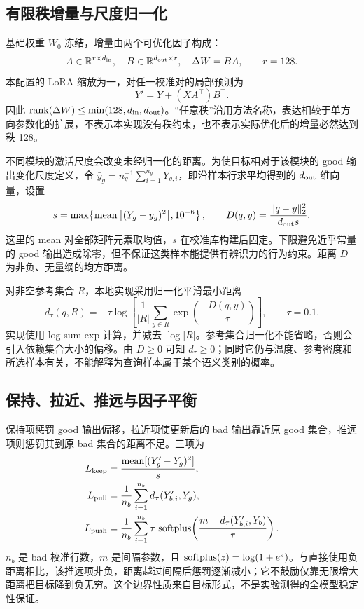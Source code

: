 \subsection{有限秩增量与尺度归一化}

基础权重 $W_0$ 冻结，增量由两个可优化因子构成：
\begin{equation}
 A\in\mathbb{R}^{r\times d_{\rm in}},\quad
 B\in\mathbb{R}^{d_{\rm out}\times r},\quad
 \Delta W=BA,\qquad r=128.
 \label{eq:factors}
\end{equation}
本配置的 LoRA 缩放为一，对任一校准对的局部预测为
\begin{equation}
 Y'=Y+(XA^\top)B^\top.
 \label{eq:local-output}
\end{equation}
因此 $\operatorname{rank}(\Delta W)\leq\min(128,d_{\rm in},d_{\rm out})$。“任意秩”沿用方法名称，表达相较于单方向参数化的扩展，不表示本实现没有秩约束，也不表示实际优化后的增量必然达到秩 128。

不同模块的激活尺度会改变未经归一化的距离。为使目标相对于该模块的 good 输出变化尺度定义，令 $\bar y_g=n_g^{-1}\sum_{i=1}^{n_g}Y_{g,i}$，即沿样本行求平均得到的 $d_{\rm out}$ 维向量，设置
\begin{equation}
 s=\max\!\left\{\operatorname{mean}\big[(Y_g-\bar y_g)^2\big],10^{-6}\right\},
 \qquad D(q,y)=\frac{\|q-y\|_2^2}{d_{\rm out}s}.
 \label{eq:scale}
\end{equation}
这里的 mean 对全部矩阵元素取均值，$s$ 在校准库构建后固定。下限避免近乎常量的 good 输出造成除零，但不保证这类样本能提供有辨识力的行为约束。距离 $D$ 为非负、无量纲的均方距离。

对非空参考集合 $R$，本地实现采用归一化平滑最小距离
\begin{equation}
 d_\tau(q,R)=-\tau\log\left[
 \frac{1}{|R|}\sum_{y\in R}\exp\!\left(-\frac{D(q,y)}{\tau}\right)
 \right],\qquad \tau=0.1.
 \label{eq:softmin}
\end{equation}
实现使用 log-sum-exp 计算，并减去 $\log |R|$。参考集合归一化不能省略，否则会引入依赖集合大小的偏移。由 $D\geq0$ 可知 $d_\tau\geq0$；同时它仍与温度、参考密度和所选样本有关，不能解释为查询样本属于某个语义类别的概率。

\subsection{保持、拉近、推远与因子平衡}

保持项惩罚 good 输出偏移，拉近项使更新后的 bad 输出靠近原 good 集合，推远项则惩罚其到原 bad 集合的距离不足。三项为
\begin{align}
 L_{\rm keep}&=\frac{\operatorname{mean}[(Y'_g-Y_g)^2]}{s},
 \label{eq:keep}\\
 L_{\rm pull}&=\frac{1}{n_b}\sum_{i=1}^{n_b}d_\tau(Y'_{b,i},Y_g),
 \label{eq:pull}\\
 L_{\rm push}&=\frac{1}{n_b}\sum_{i=1}^{n_b}
 \tau\,\operatorname{softplus}\!\left(\frac{m-d_\tau(Y'_{b,i},Y_b)}{\tau}\right).
 \label{eq:push}
\end{align}
$n_b$ 是 bad 校准行数，$m$ 是间隔参数，且 $\operatorname{softplus}(z)=\log(1+e^z)$。与直接使用负距离相比，该推远项非负，距离越过间隔后惩罚逐渐减小；它不鼓励仅靠无限增大距离把目标降到负无穷。这个边界性质来自目标形式，不是实验测得的全模型稳定性保证。

